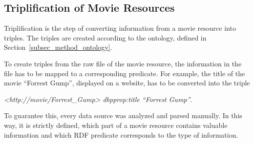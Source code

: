 \subsection{Triplification of Movie Resources}
\label{subsec_method_triplification}

Triplification is the step of converting information from a movie resource into triples.
The triples are created according to the ontology, defined in Section~\ref{subsec_method_ontology}.

To create triples from the raw file of the movie resource, the information in the file has to be mapped to a corresponding predicate.
For example, the title of the movie ``Forrest Gump'', displayed on a website, has to be converted into the triple
\begin{center}\emph{<http://movie/Forrest\_Gump> dbpprop:title ``Forrest Gump''}.\end{center}
To guarantee this, every data source was analyzed and parsed manually.
In this way, it is strictly defined, which part of a movie resource contains valuable information and which RDF predicate corresponds to the type of information.